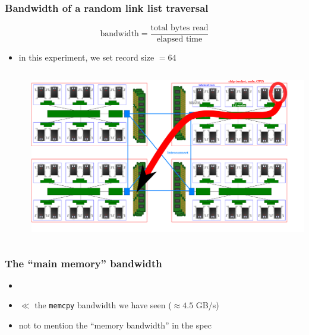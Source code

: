 \documentclass[12pt,dvipdfmx]{beamer}
\begin{document}
\begin{frame}
\frametitle{Bandwidth of a random link list traversal}
\[ \mbox{bandwidth} = \frac{\mbox{total bytes read}}{\mbox{elapsed time}} \]
\begin{itemize}
\item in this experiment, we set record size $= 64$
\begin{columns}
\begin{column}{0.75\textwidth}
  {\scriptsize}
  
\end{column}
\begin{column}{0.25\textwidth}
\includegraphics[width=\textwidth]{out/pdf/svg/diagram_multisocket_remote.pdf}
\end{column}
\end{columns}
\end{itemize}
\end{frame}

\begin{frame}
\frametitle{The ``main memory'' bandwidth}
\begin{itemize}
\item []
  {\scriptsize}
\item $\ll$ the \texttt{memcpy} bandwidth we have seen ($\approx 4.5$ GB/s)
\item not to mention the ``memory bandwidth'' in the spec
\end{itemize}
\end{frame}
\end{document}
